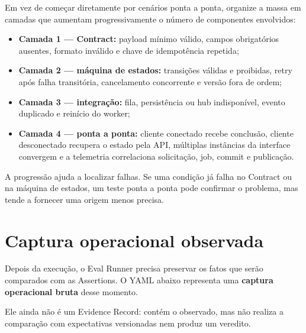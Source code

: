\documentclass[
  10pt,
  a4paper,
  oneside]{book}
\providecommand{\tightlist}{%
  \setlength{\itemsep}{0pt}\setlength{\parskip}{0pt}}
\begin{document}
Em vez de começar diretamente por cenários ponta a ponta, organize a
massa em camadas que aumentam progressivamente o número de componentes
envolvidos:

\begin{itemize}
\tightlist
\item
  \textbf{Camada 1 --- Contract:} payload mínimo válido, campos
  obrigatórios ausentes, formato inválido e chave de idempotência
  repetida;
\item
  \textbf{Camada 2 --- máquina de estados:} transições válidas e
  proibidas, retry após falha transitória, cancelamento concorrente e
  versão fora de ordem;
\item
  \textbf{Camada 3 --- integração:} fila, persistência ou hub
  indisponível, evento duplicado e reinício do worker;
\item
  \textbf{Camada 4 --- ponta a ponta:} cliente conectado recebe
  conclusão, cliente desconectado recupera o estado pela API, múltiplas
  instâncias da interface convergem e a telemetria correlaciona
  solicitação, job, commit e publicação.
\end{itemize}

A progressão ajuda a localizar falhas. Se uma condição já falha no
Contract ou na máquina de estados, um teste ponta a ponta pode confirmar
o problema, mas tende a fornecer uma origem menos precisa.

\hypertarget{captura-operacional-observada}{%
\section{Captura operacional
observada}\label{captura-operacional-observada}}

Depois da execução, o Eval Runner precisa preservar os fatos que serão
comparados com as Assertions. O YAML abaixo representa uma
\textbf{captura operacional bruta} desse momento.

Ele ainda não é um Evidence Record: contém o observado, mas não realiza
a comparação com expectativas versionadas nem produz um veredito.
\end{document}
